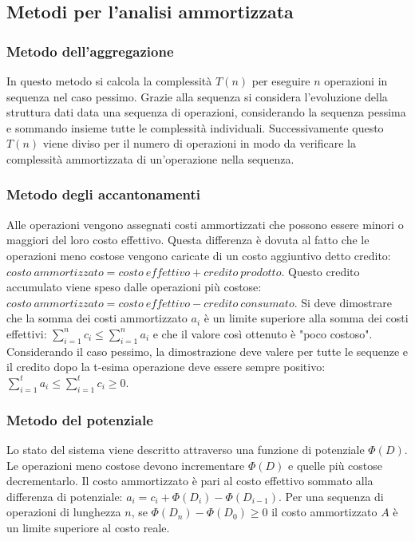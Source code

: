 \subsection{Metodi per l'analisi ammortizzata}
\subsubsection{Metodo dell'aggregazione}
In questo metodo si calcola la complessit\`a $T(n)$ per eseguire $n$ operazioni in sequenza nel caso pessimo. Grazie alla sequenza si considera l'evoluzione
della struttura dati data una sequenza di operazioni, considerando la sequenza pessima e sommando insieme tutte le complessit\`a individuali. 
Successivamente questo $T(n)$ viene diviso per il numero di operazioni in modo da verificare la complessit\`a ammortizzata di un'operazione nella sequenza.
\subsubsection{Metodo degli accantonamenti}
Alle operazioni vengono assegnati costi ammortizzati che possono essere minori o maggiori del loro costo effettivo. Questa differenza \`e dovuta al fatto
che le operazioni meno costose vengono caricate di un costo aggiuntivo detto credito: $costo\ ammortizzato=costo\ effettivo+credito\ prodotto$. Questo 
credito accumulato viene speso dalle operazioni pi\`u costose: $costo\ ammortizzato=costo\ effettivo-credito\ consumato$. Si deve dimostrare che la somma
dei costi ammortizzato $a_i$ \`e un limite superiore alla somma dei costi effettivi: $\sum\limits_{i=1}^nc_i\le\sum\limits_{i=1}^na_i$ e che il valore 
cos\`i ottenuto \`e "poco costoso". Considerando il caso pessimo, la dimostrazione deve valere per tutte le sequenze e il credito dopo la t-esima operazione
deve essere sempre positivo: $\sum\limits_{i=1}^ta_i\le\sum\limits_{i=1}^tc_i\ge 0$.
\subsubsection{Metodo del potenziale}
Lo stato del sistema viene descritto attraverso una funzione di potenziale $\Phi(D)$. Le operazioni meno costose devono incrementare $\Phi(D)$ e quelle
pi\`u costose decrementarlo. Il costo ammortizzato \`e pari al costo effettivo sommato alla differenza di potenziale: $a_i=c_i+\Phi(D_i)-\Phi(D_{i-1})$.
Per una sequenza di operazioni di lunghezza $n$, se $\Phi(D_n)-\Phi(D_0)\ge 0$ il costo ammortizzato $A$ \`e un limite superiore al costo reale.
